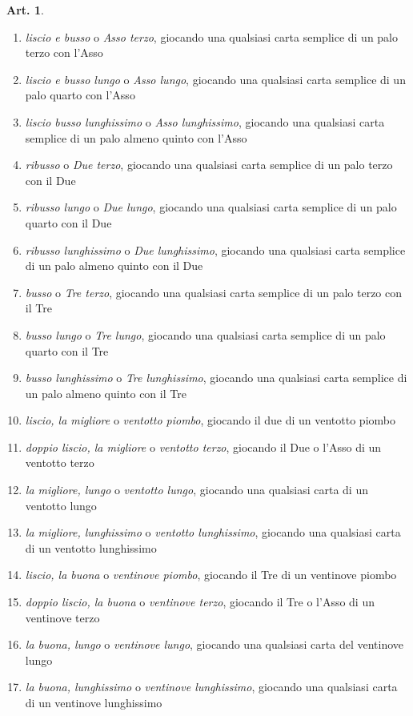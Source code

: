 \documentclass[italian,a4paper]{book}
\theoremstyle{definition}
\newtheorem{art}{Art.}
\newenvironment{packedenum}{
\begin{enumerate}
  \setlength{\itemsep}{1pt}
  \setlength{\parskip}{0pt}
  \setlength{\parsep}{0pt}
}{\end{enumerate}}
\begin{document}
\begin{art}
\begin{packedenum}
\item \emph{liscio e busso} o \emph{Asso terzo},  giocando una qualsiasi carta semplice di un palo terzo con l'Asso
\item \emph{liscio e busso lungo} o \emph{Asso lungo},  giocando una qualsiasi carta semplice di un palo quarto con l'Asso
\item \emph{liscio  busso lunghissimo} o \emph{Asso lunghissimo},  giocando una qualsiasi carta semplice di un palo almeno quinto con l'Asso
\item \emph{ribusso} o \emph{Due terzo},  giocando una qualsiasi carta semplice di un palo terzo con il Due
\item \emph{ribusso lungo} o \emph{Due lungo},  giocando una qualsiasi carta semplice di un palo quarto con il Due
\item \emph{ribusso lunghissimo} o \emph{Due lunghissimo},  giocando una qualsiasi carta semplice di un palo almeno quinto con il Due
\item \emph{busso} o \emph{Tre terzo},  giocando una qualsiasi carta semplice di un palo terzo con il Tre
\item \emph{busso lungo} o \emph{Tre lungo},  giocando una qualsiasi carta semplice di un palo quarto con il Tre
\item \emph{busso lunghissimo} o \emph{Tre lunghissimo},  giocando una qualsiasi carta semplice di un palo almeno quinto con il Tre
\item \emph{liscio, la migliore} o \emph{ventotto piombo},  giocando il due di un ventotto piombo
\item \emph{doppio liscio, la migliore} o \emph{ventotto terzo},  giocando il Due o l'Asso di un ventotto terzo
\item \emph{la migliore, lungo} o \emph{ventotto lungo},  giocando una qualsiasi carta di un ventotto lungo
\item \emph{la migliore, lunghissimo} o \emph{ventotto lunghissimo},  giocando una qualsiasi carta di un ventotto lunghissimo
\item \emph{liscio, la buona} o \emph{ventinove piombo},  giocando il Tre di un ventinove piombo
\item \emph{doppio liscio, la buona} o \emph{ventinove terzo},  giocando il Tre o l'Asso di un ventinove terzo
\item \emph{la buona, lungo} o \emph{ventinove lungo},  giocando una qualsiasi carta del ventinove lungo
\item \emph{la buona, lunghissimo} o \emph{ventinove lunghissimo},  giocando una qualsiasi carta di un ventinove lunghissimo

\end{packedenum}
\end{art}
\end{document}
